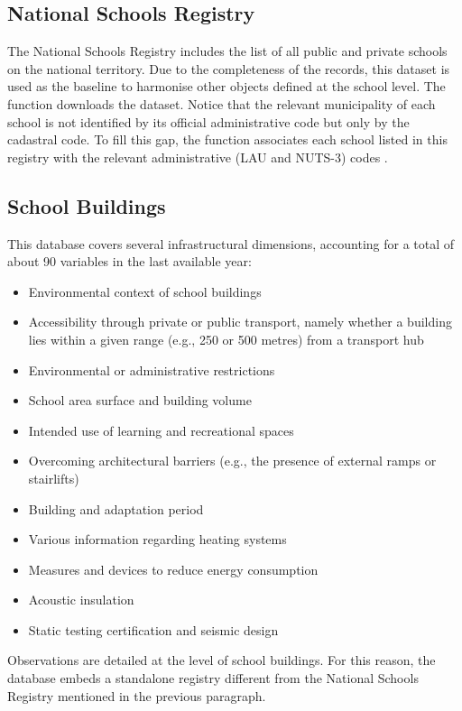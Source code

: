 \documentclass[openany, 11pt, oneside]{book}
\begin{document}
\subsection{National Schools Registry} \label{par:registry}
The National Schools Registry includes the list of all public and private schools on the national territory. Due to the completeness of the records, this dataset is used as the baseline to harmonise other objects defined at the school level. The function \texttt{} downloads the dataset. Notice that the relevant municipality of each school is not identified by its official administrative code but only by the cadastral code. To fill this gap, the function \texttt{} associates each school listed in this registry with the relevant administrative (LAU and NUTS-3) codes \parencite{Situas}.

\subsection{School Buildings} \label{par:buildings}
This database covers several infrastructural dimensions, accounting for a total of about 90 variables in the last available year:
\begin{itemize}
 \item Environmental context of school buildings
 \item Accessibility through private or public transport, namely whether a building lies within a given range (e.g., 250 or 500 metres) from a transport hub
 \item Environmental or administrative restrictions 
 \item School area surface and building volume
 \item Intended use of learning and recreational spaces
 \item Overcoming architectural barriers (e.g., the presence of external ramps or stairlifts)
 \item Building and adaptation period
 \item Various information regarding heating systems
 \item Measures and devices to reduce energy consumption
 \item Acoustic insulation
 \item Static testing certification and seismic design
\end{itemize}
Observations are detailed at the level of school buildings. For this reason, the database embeds a standalone registry different from the National Schools Registry mentioned in the previous paragraph. 
\end{document}
